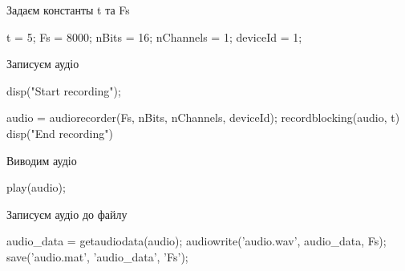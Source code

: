 \documentclass[lab6_2.tex]{subfiles}
\begin{document}
\begin{par}
\begin{flushleft}
Задаєм константы t та Fs
\end{flushleft}
\end{par}

\begin{matlabcode}
t = 5;
Fs = 8000;
nBits = 16;
nChannels = 1;
deviceId = 1;
\end{matlabcode}

\begin{par}
\begin{flushleft}
Записуєм аудіо
\end{flushleft}
\end{par}

\begin{matlabcode}
disp("Start recording");
\end{matlabcode}
\begin{matlabcode}
audio = audiorecorder(Fs, nBits, nChannels, deviceId);
recordblocking(audio, t)
disp("End recording")
\end{matlabcode}

\begin{par}
\begin{flushleft}
Виводим аудіо
\end{flushleft}
\end{par}

\begin{matlabcode}
play(audio);
\end{matlabcode}

\begin{par}
\begin{flushleft}
Записуєм аудіо до файлу
\end{flushleft}
\end{par}

\begin{matlabcode}
audio_data = getaudiodata(audio);
audiowrite('audio.wav', audio_data, Fs);
save('audio.mat', 'audio_data', 'Fs');
\end{matlabcode}
\end{document}
